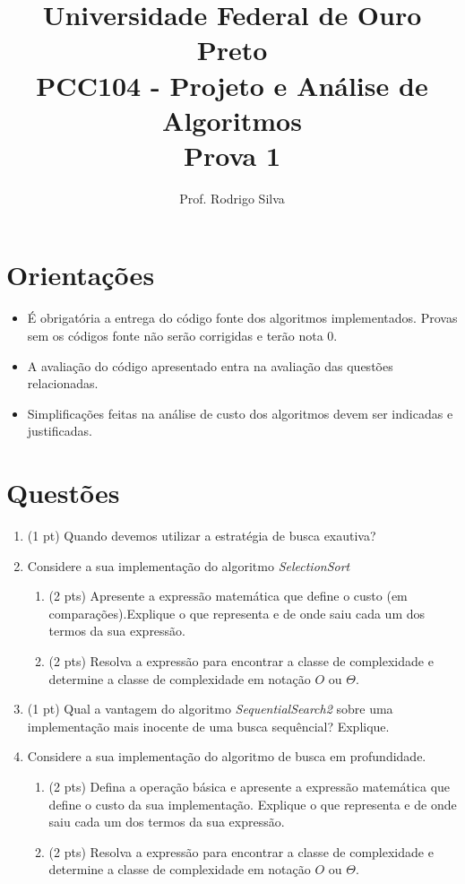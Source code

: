\documentclass{article}
\title{\vspace{-2 cm}Universidade Federal de Ouro Preto \\ PCC104 - Projeto e Análise de Algoritmos \\ Prova 1}
\author{Prof. Rodrigo Silva}
\begin{document}
\maketitle

\section*{Orientações}

\begin{itemize}
    \item É obrigatória a entrega do código fonte dos algoritmos implementados. Provas sem os códigos fonte não serão corrigidas e terão nota 0.
    \item A avaliação do código apresentado entra na avaliação das questões relacionadas. 
    \item Simplificações feitas na análise de custo dos algoritmos devem ser indicadas e justificadas.
\end{itemize}

\section*{Questões}

\begin{enumerate}
    \item (1 pt) Quando devemos utilizar a estratégia de busca exautiva?
    
    \item Considere a sua implementação do algoritmo \textit{SelectionSort}

    \begin{enumerate}
        \item (2 pts) Apresente a expressão matemática que define o custo (em comparações).Explique o que representa e de onde saiu cada um dos termos da sua expressão. 
        \item (2 pts) Resolva a expressão para encontrar a classe de complexidade e determine a classe de complexidade em notação $O$ ou $\Theta$. 
    \end{enumerate}

    \item (1 pt) Qual a vantagem do algoritmo \textit{SequentialSearch2} sobre uma implementação mais inocente de uma busca sequêncial? Explique.
    
    \item Considere a sua implementação do algoritmo de busca em profundidade.
    \begin{enumerate}
        \item (2 pts) Defina a operação básica e apresente a expressão matemática que define o custo da sua implementação. Explique o que representa e de onde saiu cada um dos termos da sua expressão. 
        \item (2 pts) Resolva a expressão para encontrar a classe de complexidade e determine a classe de complexidade em notação $O$ ou $\Theta$.
    \end{enumerate}

\end{enumerate}
\end{document}
